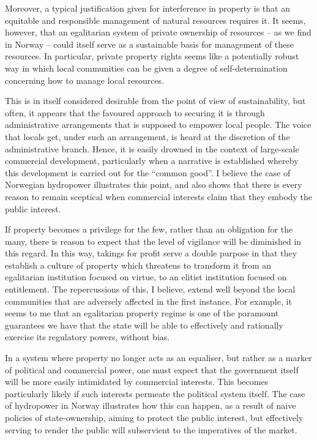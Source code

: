 Moreover, a typical justification given for interference in property is that an equitable and responsible management of natural resources requires it. It seems, however, that an egalitarian system of private ownership of resources -- as we find in Norway -- could itself serve as a sustainable basis for management of these resources. In particular, private property rights seems like a potentially robust way in which local communities can be given a degree of self-determination concerning how to manage local resources. 

This is in itself considered desirable from the point of view of sustainability, but often, it appears that the favoured approach to securing it is through administrative arrangements that is supposed to empower local people. The voice that locals get, under such an arrangement, is heard at the discretion of the administrative branch. Hence, it is easily drowned in the context of large-scale commercial development, particularly when a narrative is established whereby this development is carried out for the ``common good''. I believe the case of Norwegian hydropower illustrates this point, and also shows that there is every reason to remain sceptical when commercial interests claim that they embody the public interest.

If property becomes a privilege for the few, rather than an obligation for the many, there is reason to expect that the level of vigilance will be diminished in this regard. In this way, takings for profit serve a double purpose in that they establish a culture of property which threatens to transform it from an egalitarian institution focused on virtue, to an elitist institution focused on entitlement.
The repercussions of this, I believe, extend well beyond the local communities that are adversely affected in the first instance. For example, it seems to me that an egalitarian property regime is one of the paramount guarantees we have that the state will be able to effectively and rationally exercise its regulatory powers, without bias. 

In a system where property no longer acts as an equaliser, but rather as a marker of political and commercial power, one must expect that the government itself will be more easily intimidated by commercial interests. This becomes particularly likely if such interests permeate the political system itself. The case of hydropower in Norway illustrates how this can happen, as a result of naive policies of state-ownership, aiming to protect the public interest, but effectively serving to render the public will subservient to the imperatives of the market. 

